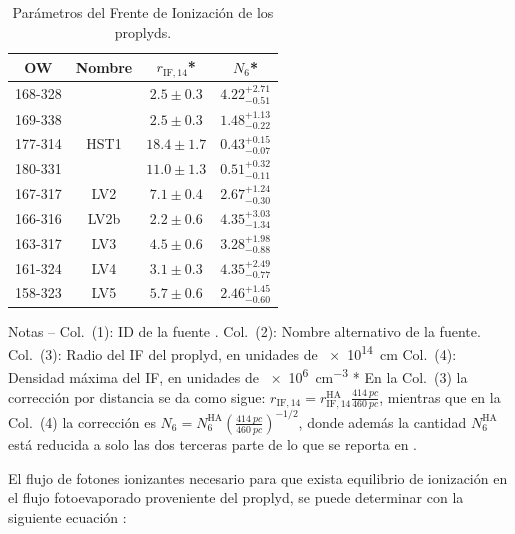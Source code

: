 \begin{table}
  \centering
  \caption{Parámetros del Frente de Ionización de los proplyds.}
  \label{tab:Prop-IF-par}
  \begin{tabular}{cccc} \toprule
    OW      & Nombre & $r_{\mathrm{IF}, 14}$*     & $N_6$* \\
    \midrule
    168-328 &        & $2.5 \pm 0.3$  & $4.22^{+2.71}_{-0.51}$ \\
    169-338 &        & $2.5 \pm 0.3$  & $1.48^{+1.13}_{-0.22}$ \\
    177-314 & HST1   & $18.4 \pm 1.7$ & $0.43^{+0.15}_{-0.07}$ \\ 
    180-331 &        & $11.0 \pm 1.3$ & $0.51^{+0.32}_{-0.11}$ \\
    167-317 & LV2    & $7.1 \pm 0.4$  & $2.67^{+1.24}_{-0.30}$ \\
    166-316 & LV2b   & $2.2 \pm 0.6$  & $4.35^{+3.03}_{-1.34}$ \\
    163-317 & LV3    & $4.5 \pm 0.6$  & $3.28^{+1.98}_{-0.88}$ \\
    161-324 & LV4    & $3.1 \pm 0.3$  & $4.35^{+2.49}_{-0.77}$ \\
    158-323 & LV5    & $5.7 \pm 0.6$  & $2.46^{+1.45}_{-0.60}$ \\
  \bottomrule
  \end{tabular}
  \begin{minipage}{0.9\linewidth}
    \footnotesize
    Notas --
%
  Col.~(1): ID de la fuente \citep{ODell:1994a}.
%
  Col.~(2): Nombre alternativo de la fuente.
%
  Col.~(3): Radio del IF del proplyd, en unidades de \SI{e14}{cm}
%
  Col.~(4): Densidad máxima del IF, en unidades de \SI{e6}{cm^{-3}}
%
  * En la Col.~(3) la corrección por distancia se da como sigue: $r_{\mathrm{IF}, 14} = r_{\mathrm{IF}, 14}^{\mathrm{HA}}\frac{\SI{414}{pc}}{\SI{460}{pc}}$, mientras que en la Col.~(4) la corrección es $N_6 = N_6^{\mathrm{HA}}\left(\frac{\SI{414}{pc}}{\SI{460}{pc}}\right)^{-1/2}$, donde además la cantidad $N_6^{\mathrm{HA}}$ está reducida a solo las dos terceras parte de lo que se reporta en \citet{HA:1998}.
  \end{minipage}
\end{table}

El flujo de fotones ionizantes necesario para que exista equilibrio de ionización en el flujo fotoevaporado proveniente del proplyd, se puede determinar con la siguiente ecuación \citep{Henney:2001}:

